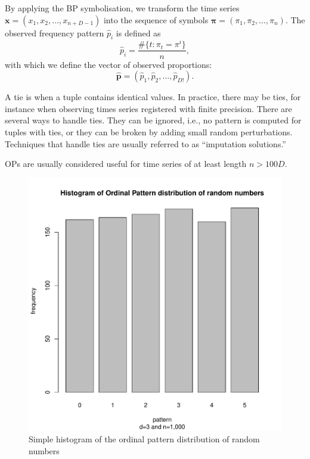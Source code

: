 By applying the BP symbolisation, we transform the time series 
$\bm x = (x_1, x_2, \dots, x_{n+D-1})$ into the sequence of symbols
$\bm \pi = (\pi_1, \pi_2,\dots, \pi_n)$.
The observed frequency pattern $\widehat{p}_i$ is defined as
$$
\widehat{p}_i=\frac{\#\{t : \pi_t = \pi^i\}}{n} ,
$$
with which we define the vector of observed proportions:
$$
\widehat{\bm p} = (\widehat{p}_1, \widehat{p}_2, \dots, \widehat{p}_{D!}).
$$



A tie is when a tuple contains identical values. In practice, there may be ties, for instance when observing times series registered with finite precision.
There are several ways to handle ties.
They can be ignored, i.e., no pattern is computed for tuples with ties,
or they can be broken by adding small random perturbations. 
Techniques that handle ties are usually referred to as ``imputation solutions.''

OPs are usually considered useful for time series of at least length $n>100D$.

\begin{figure}
    \centering
    \includegraphics[width=\textwidth,keepaspectratio]{./powerlaw/histogram.pdf}
    \caption{Simple histogram of the ordinal pattern distribution of random numbers}
\end{figure}

